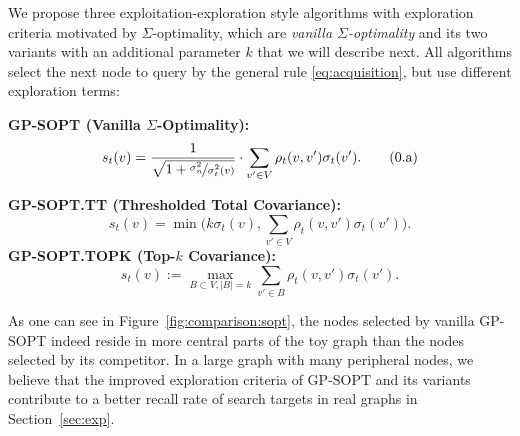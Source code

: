 We propose three exploitation-exploration style algorithms with  exploration criteria motivated by $\Sigma$-optimality, which are \emph{vanilla $\Sigma$-optimality} and its two variants with an additional parameter $k$ that we will describe next.
All algorithms select the next node to query by the general rule \eqref{eq:acquisition}, but use different exploration terms:
% 

\textbf{GP-SOPT (Vanilla $\Sigma$-Optimality):} %
\begin{equation}
	s_t(v) 
	=
		\frac{1}{\sqrt{1+\nicefrac{\sigma_n^2}{\sigma_t^2(v)}}}
	\cdot
	\sum_{v'\in V}\rho_t(v,v')\sigma_t(v').
	\label{eq:sopt.orig} \tag{\theequation.a}
\end{equation}



\textbf{GP-SOPT.TT (Thresholded Total Covariance):} %
		\begin{equation}
			s_{t}(v) = \min\Biggl(k \sigma_{t}(v), 
			\sum_{v'\in V}\rho_t(v,v')\sigma_t(v')
			\Biggr).
			\label{eq:sopt.tt} \tag{\theequation.b}
		\end{equation}
\textbf{GP-SOPT.TOPK (Top-$k$ Covariance):} %
		\begin{equation}
			s_{t}(v) := \max_{B \subset V, |B| = k} 
			\sum_{v' \in B} \rho_{t}(v,v')\sigma_{t}(v').
			\label{eq:sopt.topk} \tag{\theequation.c}
		\end{equation}

As one can see in Figure~\ref{fig:comparison:sopt}, the nodes selected by vanilla GP-SOPT indeed reside in more central parts of the toy graph than the nodes selected by its competitor. In a large graph with many peripheral nodes, we believe that the improved exploration criteria of GP-SOPT and its variants contribute to a better recall rate of search targets in real graphs in Section~\ref{sec:exp}.



